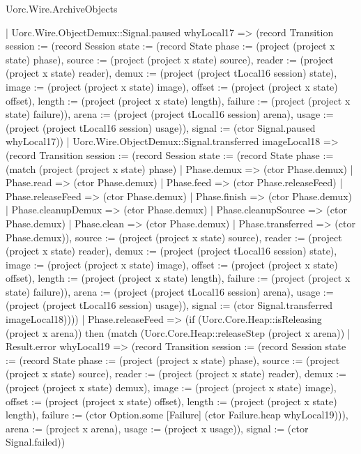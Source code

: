 \begin{lexlean}{Uorc.Wire.ArchiveObjects}
\begin{semanticmodule}
{          | Uorc.Wire.ObjectDemux::Signal.paused whyLocal17 => (record Transition {session := (record Session {state := (record State {phase := (project (project x state) phase), source := (project (project x state) source), reader := (project (project x state) reader), demux := (project (project tLocal16 session) state), image := (project (project x state) image), offset := (project (project x state) offset), length := (project (project x state) length), failure := (project (project x state) failure)}), arena := (project (project tLocal16 session) arena), usage := (project (project tLocal16 session) usage)}), signal := (ctor Signal.paused whyLocal17)})
          | Uorc.Wire.ObjectDemux::Signal.transferred imageLocal18 => (record Transition {session := (record Session {state := (record State {phase := (match (project (project x state) phase)
            | Phase.demux => (ctor Phase.demux)
            | Phase.read => (ctor Phase.demux)
            | Phase.feed => (ctor Phase.releaseFeed)
            | Phase.releaseFeed => (ctor Phase.demux)
            | Phase.finish => (ctor Phase.demux)
            | Phase.cleanupDemux => (ctor Phase.demux)
            | Phase.cleanupSource => (ctor Phase.demux)
            | Phase.clean => (ctor Phase.demux)
            | Phase.transferred => (ctor Phase.demux)), source := (project (project x state) source), reader := (project (project x state) reader), demux := (project (project tLocal16 session) state), image := (project (project x state) image), offset := (project (project x state) offset), length := (project (project x state) length), failure := (project (project x state) failure)}), arena := (project (project tLocal16 session) arena), usage := (project (project tLocal16 session) usage)}), signal := (ctor Signal.transferred imageLocal18)})))
        | Phase.releaseFeed => (if (Uorc.Core.Heap::isReleasing (project x arena)) then (match (Uorc.Core.Heap::releaseStep (project x arena))
          | Result.error whyLocal19 => (record Transition {session := (record Session {state := (record State {phase := (project (project x state) phase), source := (project (project x state) source), reader := (project (project x state) reader), demux := (project (project x state) demux), image := (project (project x state) image), offset := (project (project x state) offset), length := (project (project x state) length), failure := (ctor Option.some [Failure] (ctor Failure.heap whyLocal19))}), arena := (project x arena), usage := (project x usage)}), signal := (ctor Signal.failed)})
}
\end{semanticmodule}
\end{lexlean}
